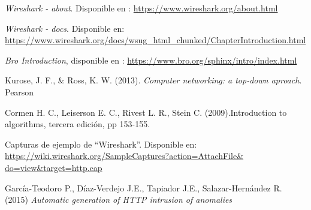 \begin{thebibliography}{99}
 \textit{Wireshark - about}. Disponible en : \url{https://www.wireshark.org/about.html}

 \textit{Wireshark - docs}. Disponible en: \url{https://www.wireshark.org/docs/wsug_html_chunked/ChapterIntroduction.html}

\textit{Bro Introduction}, disponible en : \url{https://www.bro.org/sphinx/intro/index.html}

Kurose, J. F., \& Ross, K. W. (2013). \textit{Computer networking: a top-down aproach}. Pearson

 Cormen H. C., Leiserson E. C., Rivest L. R., Stein C. (2009).Introduction to algorithms, tercera edición, pp 153-155.

 Capturas de ejemplo de “Wireshark”. Disponible en:  \url{https://wiki.wireshark.org/SampleCaptures?action=AttachFile&
do=view&target=http.cap}

 García-Teodoro P., Díaz-Verdejo J.E., Tapiador J.E., Salazar-Hernández R. (2015) \textit{Automatic generation of HTTP intrusion of anomalies}

\end{thebibliography}